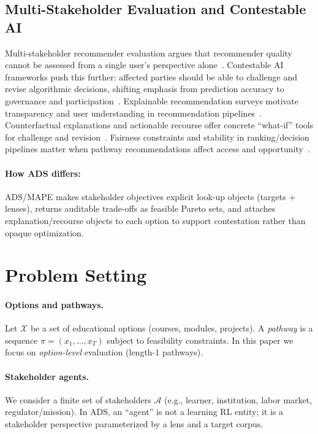 \documentclass[sigconf,review]{acmart}
\newcommand{\ADS}{\textsc{ADS}\xspace}
\newcommand{\MAPE}{\textsc{MAPE}\xspace}
\begin{document}
\subsection{Multi-Stakeholder Evaluation and Contestable AI}
Multi-stakeholder recommender evaluation argues that recommender quality cannot be assessed from a single user's perspective alone~\cite{abdollahpouri2020multistakeholder,burke2025mseval,ge2024trustworthyRS}.
Contestable AI frameworks push this further: affected parties should be able to challenge and revise algorithmic decisions, shifting emphasis from prediction accuracy to governance and participation~\cite{aler2020contestable,alfrink2023contestable,dignum2025contesting}.
Explainable recommendation surveys motivate transparency and user understanding in recommendation pipelines~\cite{zhang2020explainableRS}.
Counterfactual explanations and actionable recourse offer concrete ``what-if'' tools for challenge and revision~\cite{wachter2017counterfactual,ustun2019recourse,robustx2025}.
Fairness constraints and stability in ranking/decision pipelines matter when pathway recommendations affect access and opportunity~\cite{ekstrand2019fairness,dwork2012fairness,hardt2016equality,fairRankAgg2025,fairdas2024}.
\paragraph{How ADS differs:} \ADS/\MAPE makes stakeholder objectives explicit look-up objects (targets + lenses), returns auditable trade-offs as feasible Pareto sets, and attaches explanation/recourse objects to each option to support contestation rather than opaque optimization.


\section{Problem Setting}
\label{sec:setting}

\paragraph{Options and pathways.}
Let $\mathcal{X}$ be a set of educational options (courses, modules, projects). A \emph{pathway} is a sequence $\pi=(x_1,\dots,x_T)$ subject to feasibility constraints. In this paper we focus on \emph{option-level} evaluation (length-$1$ pathways).

\paragraph{Stakeholder agents.}
We consider a finite set of stakeholders $\mathcal{A}$ (e.g., learner, institution, labor market, regulator/mission). In \ADS, an ``agent'' is not a learning RL entity; it is a stakeholder perspective parameterized by a lens and a target corpus.
\end{document}
